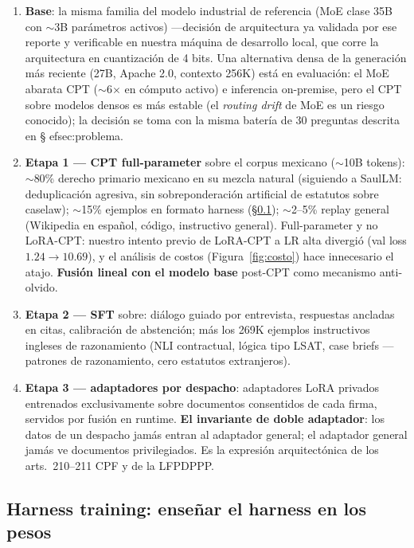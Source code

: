 \begin{enumerate}
\item \textbf{Base}: la misma familia del modelo industrial de referencia (MoE clase 35B con $\sim$3B parámetros activos) ---decisión de arquitectura ya validada por ese reporte y verificable en nuestra máquina de desarrollo local, que corre la arquitectura en cuantización de 4 bits. Una alternativa densa de la generación más reciente (27B, Apache 2.0, contexto 256K) está en evaluación: el MoE abarata CPT ($\sim$6$\times$ en cómputo activo) e inferencia on-premise, pero el CPT sobre modelos densos es más estable (el \emph{routing drift} de MoE es un riesgo conocido); la decisión se toma con la misma batería de 30 preguntas descrita en \S
ef{sec:problema}.
\item \textbf{Etapa 1 --- CPT full-parameter} sobre el corpus mexicano ($\sim$10B tokens): $\sim$80\% derecho primario mexicano en su mezcla natural (siguiendo a SaulLM: deduplicación agresiva, sin sobreponderación artificial de estatutos sobre caselaw\cite{colombo2024}); $\sim$15\% ejemplos en formato harness (\S\ref{sec:harness}); $\sim$2--5\% replay general (Wikipedia en español, código, instructivo general). Full-parameter y no LoRA-CPT: nuestro intento previo de LoRA-CPT a LR alta divergió (val loss $1.24 \rightarrow 10.69$), y el análisis de costos (Figura~\ref{fig:costo}) hace innecesario el atajo. \textbf{Fusión lineal con el modelo base} post-CPT como mecanismo anti-olvido.
\item \textbf{Etapa 2 --- SFT} sobre: diálogo guiado por entrevista, respuestas ancladas en citas, calibración de abstención; más los 269K ejemplos instructivos ingleses de razonamiento (NLI contractual, lógica tipo LSAT, case briefs ---patrones de razonamiento, cero estatutos extranjeros).
\item \textbf{Etapa 3 --- adaptadores por despacho}: adaptadores LoRA privados entrenados exclusivamente sobre documentos consentidos de cada firma, servidos por fusión en runtime. \textbf{El invariante de doble adaptador}: los datos de un despacho jamás entran al adaptador general; el adaptador general jamás ve documentos privilegiados. Es la expresión arquitectónica de los arts.~210--211 CPF y de la LFPDPPP.\cite{cpf,lfpdppp}
\end{enumerate}

\subsection{Harness training: enseñar el harness en los pesos}\label{sec:harness}

